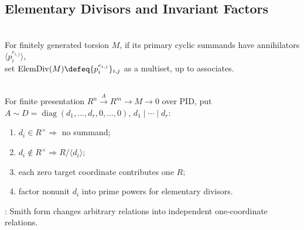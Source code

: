 \subsection{Elementary Divisors and Invariant Factors}

\begin{definition} \label{def:elementary-divisors-pid-module} \\
For finitely generated torsion $M$, if its primary cyclic summands have annihilators
$\langle p_i^{e_{i,j}}\rangle$,\\
set $\operatorname{ElemDiv}(M)\defeq\{p_i^{e_{i,j}}\}_{i,j}$ as a multiset, up to associates.
\end{definition}

\begin{method} \label{meth:smith-form-module-presentation} \\
For finite presentation $R^n\xrightarrow{A}R^m\to M\to0$ over PID, put $A\sim D=\operatorname{diag}(d_1,\ldots,d_r,0,\ldots,0)$, $d_1\mid\cdots\mid d_r$:
\begin{enumerate}[label=(\roman*)]
\setlength{\itemsep}{0pt}
\item $d_i\in R^\times\Longrightarrow$ no summand;
\item $d_i\notin R^\times\Longrightarrow R/\langle d_i\rangle$;
\item each zero target coordinate contributes one $R$;
\item factor nonunit $d_i$ into prime powers for elementary divisors.
\end{enumerate}
: Smith form changes arbitrary relations into independent one-coordinate relations.
\end{method}

